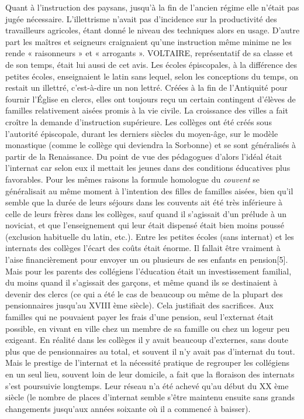  Quant à l'instruction des paysans, jusqu'à la fin de l'ancien régime elle n'était pas jugée nécessaire. L'illettrisme n'avait pas d'incidence sur la productivité des travailleurs agricoles, étant donné le niveau des techniques alors en usage. D'autre part les maîtres et seigneurs craignaient qu'une instruction même minime ne les rende « raisonneurs » et « arrogants ». VOLTAIRE, représentatif de sa classe et de son temps, était lui aussi de cet avis.
 Les écoles épiscopales, à la différence des petites écoles, enseignaient le latin sans lequel, selon les conceptions du temps, on restait un illettré, c'est-à-dire un non lettré. Créées à la fin de l'Antiquité pour fournir l'Église en clercs, elles ont toujours reçu un certain contingent d'élèves de familles relativement aisées promis à la vie civile. La croissance des villes a fait croître la demande d'instruction supérieure. Les collèges ont été créés sous l'autorité épiscopale, durant les derniers siècles du moyen-âge, sur le modèle monastique (comme le collège qui deviendra la Sorbonne) et se sont généralisés à partir de la Renaissance.
 Du point de vue des pédagogues d'alors l'idéal était l'internat car selon eux il mettait les jeunes dans des conditions éducatives plus favorables. Pour les mêmes raisons la formule homologue du \emph{couvent} se généralisait au même moment à l'intention des filles de familles aisées, bien qu'il semble que la durée de leurs séjours dans les couvents ait été très inférieure à celle de leurs frères dans les collèges, sauf quand il s'agissait d'un prélude à un noviciat, et que l'enseignement qui leur était dispensé était bien moins poussé (exclusion habituelle du latin, etc.). Entre les petites écoles (sans internat) et les internats des collèges l'écart des coûts était énorme. Il fallait être vraiment à l'aise financièrement pour envoyer un ou plusieurs de ses enfants en pension[5]. Mais pour les parents des collégiens l'éducation était un investissement familial, du moins quand il s'agissait des garçons, et même quand ils se destinaient à devenir des clercs (ce qui a été le cas de beaucoup ou même de la plupart des pensionnaires jusqu'au XVIII ème siècle). Cela justifiait des sacrifices. Aux familles qui ne pouvaient payer les frais d'une pension, seul l'externat était possible, en vivant en ville chez un membre de sa famille ou chez un logeur peu exigeant. En réalité dans les collèges il y avait beaucoup d'externes, sans doute plus que de pensionnaires au total, et souvent il n'y avait pas d'internat du tout. Mais le prestige de l'internat et la nécessité pratique de regrouper les collégiens en un seul lieu, souvent loin de leur domicile, a fait que la floraison des internats s'est poursuivie longtemps. Leur réseau n'a été achevé qu'au début du XX ème siècle (le nombre de places d'internat semble s'être maintenu ensuite sans grands changements jusqu'aux années soixante où il a commencé à baisser). 
